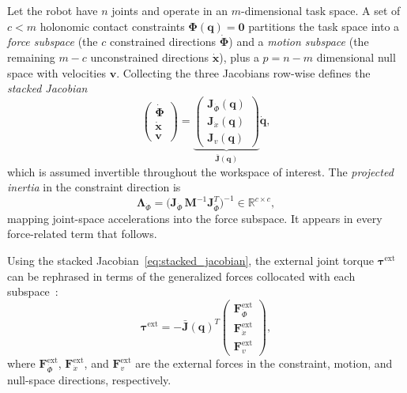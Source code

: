\documentclass[
	german,%
	accentcolor=9c,%
	ruledheaders=section,%
	class=report,%
	thesis={type=bachelor},%
	fontsize=11pt,%
	parskip=half-,%
	custommargins=true,%
	marginpar=false,%
]{tudapub}
\begin{document}
Let the robot have $n$ joints and operate in an $m$-dimensional task space.
A set of $c < m$ holonomic contact constraints $\boldsymbol{\Phi}(\mathbf{q})
= \mathbf{0}$ partitions the task space into a \emph{force subspace}
(the $c$ constrained directions $\dot{\boldsymbol{\Phi}}$) and a
\emph{motion subspace} (the remaining $m-c$ unconstrained directions
$\dot{\mathbf{x}}$), plus a $p = n - m$ dimensional null space with
velocities $\mathbf{v}$.
Collecting the three Jacobians row-wise defines the \emph{stacked Jacobian}
\begin{equation}
    \begin{pmatrix}
        \dot{\boldsymbol{\Phi}} \\ \dot{\mathbf{x}} \\ \mathbf{v}
    \end{pmatrix}
    =
    \underbrace{
    \begin{pmatrix}
        \mathbf{J}_{\dot{\Phi}}(\mathbf{q}) \\
        \mathbf{J}_{\dot{x}}(\mathbf{q}) \\
        \mathbf{J}_{v}(\mathbf{q})
    \end{pmatrix}
    }_{\bar{\mathbf{J}}(\mathbf{q})}
    \dot{\mathbf{q}},
    \label{eq:stacked_jacobian}
\end{equation}
which is assumed invertible throughout the workspace of interest.
The \emph{projected inertia} in the constraint direction is
\begin{equation}
    \boldsymbol{\Lambda}_{\dot{\Phi}}
    =
    \bigl(
        \mathbf{J}_{\dot{\Phi}}\,\mathbf{M}^{-1}\mathbf{J}_{\dot{\Phi}}^{T}
    \bigr)^{-1}
    \in \mathbb{R}^{c \times c},
    \label{eq:Lambda_phi}
\end{equation}
mapping joint-space accelerations into the force subspace.
It appears in every force-related term that follows.

Using the stacked Jacobian~\eqref{eq:stacked_jacobian}, the external joint
torque $\boldsymbol{\tau}^{\text{ext}}$ can be rephrased in terms of the
generalized forces collocated with each subspace~\cite[Eq.~12]{iskandar2023}:
\begin{equation}
    \boldsymbol{\tau}^{\text{ext}}
    = -\bar{\mathbf{J}}(\mathbf{q})^{T}
      \begin{pmatrix}
          \mathbf{F}^{\text{ext}}_{\dot{\Phi}} \\
          \mathbf{F}^{\text{ext}}_{\dot{x}} \\
          \mathbf{F}^{\text{ext}}_{v}
      \end{pmatrix},
    \label{eq:tau_ext_decomposed}
\end{equation}
where $\mathbf{F}^{\text{ext}}_{\dot{\Phi}}$,
$\mathbf{F}^{\text{ext}}_{\dot{x}}$, and $\mathbf{F}^{\text{ext}}_{v}$ are
the external forces in the constraint, motion, and null-space directions,
respectively.
\end{document}
